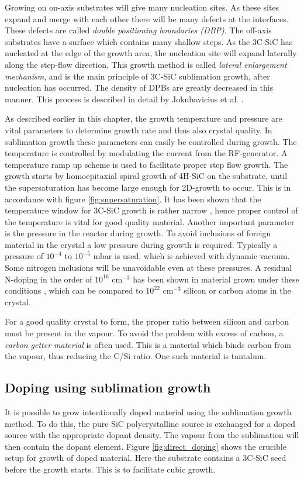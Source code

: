 Growing on on-axis substrates will give many nucleation sites. As these sites expand and merge with each other there will be many defects at the interfaces. These defects are called \emph{double positioning boundaries (DBP)}. The off-axis substrates have a surface which contains many shallow steps. As the 3C-SiC has nucleated at the edge of the growth area, the nucleation site will expand laterally along the step-flow direction. This growth method is called \emph{lateral enlargement mechanism}, and is the main principle of 3C-SiC sublimation growth, after nucleation has occurred. The density of DPBs are greatly decreased in this manner. This process is described in detail by Jokubavicius et al. \cite{Jokubavicius2014}.

As described earlier in this chapter, the growth temperature and pressure are vital parameters to determine growth rate and thus also crystal quality. In sublimation growth these parameters can easily be controlled during growth. The temperature is controlled by modulating the current from the RF-generator. A temperature ramp up scheme is used to facilitate proper step flow growth. The growth starts by homoepitaxial spiral growth of 4H-SiC on the substrate, until the supersaturation has become large enough for 2D-growth to occur. This is in accordance with figure \ref{fig:supersaturation}. It has been shown that the temperature window for 3C-SiC growth is rather narrow \cite{Vasiliauskas2012}, hence proper control of the temperature is vital for good quality material. Another important parameter is the pressure in the reactor during growth. To avoid inclusions of foreign material in the crystal a low pressure during growth is required. Typically a pressure of $10^{-4}$ to $10^{-5}$ mbar is used, which is achieved with dynamic vacuum. Some nitrogen inclusions will be unavoidable even at these pressures. A residual N-doping in the order of $10^{16}$ cm$^{-3}$ has been shown in material grown under these conditions \cite{Jokubavicius2014}, which can be compared to $10^{22}$ cm$^{-3}$ silicon or carbon atoms in the crystal. 

For a good quality crystal to form, the proper ratio between silicon and carbon must be present in the vapour. To avoid the problem with excess of carbon, a \emph{carbon getter material} is often used. This is a material which binds carbon from the vapour, thus reducing the C/Si ratio. One such material is tantalum. 

\subsection{Doping using sublimation growth}
\label{sec:growth:fsgp:doping}
It is possible to grow intentionally doped material using the sublimation growth method. To do this, the pure SiC polycrystalline source is exchanged for a doped source with the appropriate dopant density. The vapour from the sublimation will then contain the dopant element. Figure \ref{fig:direct_doping} shows the crucible setup for growth of doped material. Here the substrate contains a 3C-SiC seed before the growth starts. This is to facilitate cubic growth. 

